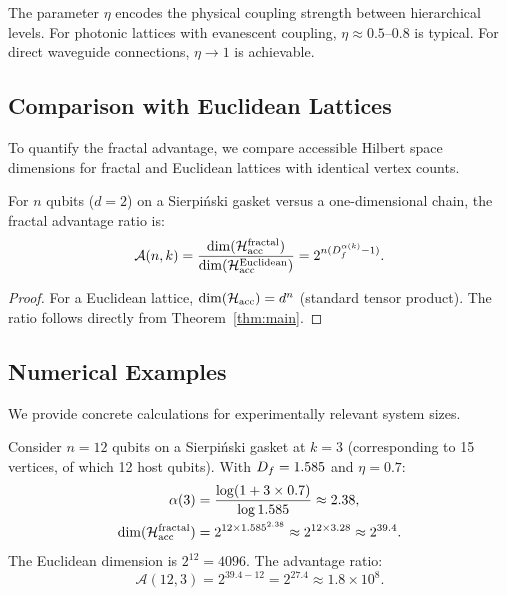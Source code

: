 \begin{remark}
The parameter $\eta$ encodes the physical coupling strength between
hierarchical levels. For photonic lattices with evanescent coupling,
$\eta \approx 0.5$--$0.8$ is typical. For direct waveguide connections,
$\eta \to 1$ is achievable.
\end{remark}

\subsection{Comparison with Euclidean Lattices}

To quantify the fractal advantage, we compare accessible Hilbert space
dimensions for fractal and Euclidean lattices with identical vertex counts.

\begin{corollary}
\label{cor:advantage}
For $n$ qubits ($d = 2$) on a Sierpi\'{n}ski gasket versus a  one-dimensional chain, the fractal advantage ratio is:
\begin{equation}
\mathcal{A}(n, k) = \frac{\dim(\mathcal{H}_{\mathrm{acc}}^{\mathrm{fractal}})}
{\dim(\mathcal{H}_{\mathrm{acc}}^{\mathrm{Euclidean}})}
= 2^{n(D_f^{\alpha(k)} - 1)}.
\label{eq:advantage}
\end{equation}
\end{corollary}

\begin{proof}
For a Euclidean lattice, $\dim(\mathcal{H}_{\mathrm{acc}}) = d^n$
(standard tensor product). The ratio follows directly from
Theorem~\ref{thm:main}.
\end{proof}

\subsection{Numerical Examples}

We provide concrete calculations for experimentally relevant system sizes.

\begin{example}
\label{ex:12qubit}
Consider $n = 12$ qubits on a Sierpi\'{n}ski gasket at $k = 3$
(corresponding to 15 vertices, of which 12 host qubits). With
$D_f = 1.585$ and $\eta = 0.7$:
\begin{align}
\alpha(3) &= \frac{\log(1 + 3 \times 0.7)}{\log 1.585} \approx 2.38, \\
\dim(\mathcal{H}_{\mathrm{acc}}^{\mathrm{fractal}}) &= 2^{12 \times 1.585^{2.38}}
\approx 2^{12 \times 3.28} \approx 2^{39.4}.
\end{align}
The Euclidean dimension is $2^{12} = 4096$. The advantage ratio:
\begin{equation}
\mathcal{A}(12, 3) = 2^{39.4 - 12} = 2^{27.4} \approx 1.8 \times 10^8.
\end{equation}
\end{example}

